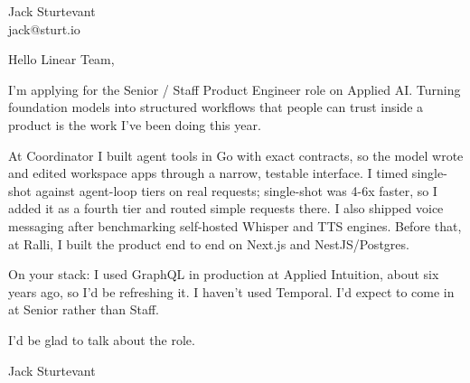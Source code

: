 \documentclass[11pt]{article}
\begin{document}
\raggedright

{\namefont\fontsize{20pt}{24pt}\selectfont Jack Sturtevant}\\[-0.3em]
jack@sturt.io

\vspace{1.2em}

Hello Linear Team,

I'm applying for the Senior / Staff Product Engineer role on Applied AI. Turning foundation models into structured workflows that people can trust inside a product is the work I've been doing this year.

At Coordinator I built agent tools in Go with exact contracts, so the model wrote and edited workspace apps through a narrow, testable interface. I timed single-shot against agent-loop tiers on real requests; single-shot was 4-6x faster, so I added it as a fourth tier and routed simple requests there. I also shipped voice messaging after benchmarking self-hosted Whisper and TTS engines. Before that, at Ralli, I built the product end to end on Next.js and NestJS/Postgres.

On your stack: I used GraphQL in production at Applied Intuition, about six years ago, so I'd be refreshing it. I haven't used Temporal. I'd expect to come in at Senior rather than Staff.

I'd be glad to talk about the role.

\vspace{0.6em}
Jack Sturtevant
\end{document}
